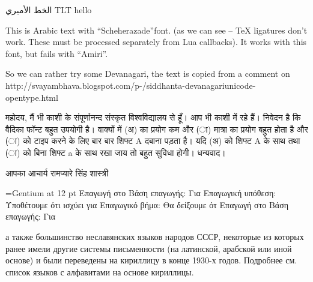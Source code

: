 \documentclass{article}
\begin{document}
 الخط الأميري {\luatextextdir TLT hello}

\egroup

\ahoj
{}

This is  Arabic text with ``Scheherazade''font. (as we can see -- TeX ligatures
don't work. These must be processed separately from Lua callbacks). 
It works with this font, but fails with ``Amiri''. 

\siddhanta
So we can rather try some Devanagari, the text is copied from a comment on http://svayambhava.\-blogspot.com\-/p\--/\-sidd\-hanta-\-deva\-na\-ga\-ri\-unicode-\-open\-type.html


महोदय,
मैं भी काशी के संपूर्णानन्द संस्कृत विश्वविद्यालय से हूँ। आप भी काशी में रहे हैं।
निवेदन है कि वैदिका फॉन्ट बहुत उपयोगी है। वाक्यों में (अ) का प्रयोग कम और (ा) मात्रा का प्रयोग बहुत होता है और (ा) को टाइप करने के लिए बार बार शिफ्ट A दबाना पड़ता है। यदि (अ) को शिफ्ट A के साथ तथा (ा) को बिना शिफ्ट a के साथ रखा जाय तो बहुत सुविधा होगी।
धन्यवाद।

आपका
आचार्य रामप्यारे सिंह शास्त्री

\font\gentium={Gentium} at 12 pt
\gentium
Επαγωγή στο 
Βάση επαγωγής: Για 
Επαγωγική υπόθεση: Υποθέτουμε ότι ισχύει για 
Επαγωγικό βήμα: Θα δείξουμε ότ
Επαγωγή στο
Βάση επαγωγής: Για 

\gentium

а также большинство неславянских языков народов СССР, некоторые из которых
ранее имели другие системы письменности (на латинской, арабской или иной
основе) и были переведены на кириллицу в конце 1930-х годов. Подробнее см.
список языков с алфавитами на основе кириллицы.  
\end{document}
